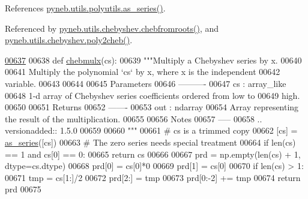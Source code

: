 References \hyperlink{polyutils_8py_source_l00115}{pyneb.\-utils.\-polyutils.\-as\-\_\-series()}.



Referenced by \hyperlink{chebyshev_8py_source_l00472}{pyneb.\-utils.\-chebyshev.\-chebfromroots()}, and \hyperlink{chebyshev_8py_source_l00309}{pyneb.\-utils.\-chebyshev.\-poly2cheb()}.


\begin{DoxyCode}
\hypertarget{namespacepyneb_1_1utils_1_1chebyshev_l00637}{}\hyperlink{namespacepyneb_1_1utils_1_1chebyshev_a91d78fa31041dfe9ccf7bbc0891809b3}{00637} 
00638 \textcolor{keyword}{def }\hyperlink{namespacepyneb_1_1utils_1_1chebyshev_a91d78fa31041dfe9ccf7bbc0891809b3}{chebmulx}(cs):
00639     \textcolor{stringliteral}{"""Multiply a Chebyshev series by x.}
00640 \textcolor{stringliteral}{}
00641 \textcolor{stringliteral}{    Multiply the polynomial `cs` by x, where x is the independent}
00642 \textcolor{stringliteral}{    variable.}
00643 \textcolor{stringliteral}{}
00644 \textcolor{stringliteral}{}
00645 \textcolor{stringliteral}{    Parameters}
00646 \textcolor{stringliteral}{    ----------}
00647 \textcolor{stringliteral}{    cs : array\_like}
00648 \textcolor{stringliteral}{        1-d array of Chebyshev series coefficients ordered from low to}
00649 \textcolor{stringliteral}{        high.}
00650 \textcolor{stringliteral}{}
00651 \textcolor{stringliteral}{    Returns}
00652 \textcolor{stringliteral}{    -------}
00653 \textcolor{stringliteral}{    out : ndarray}
00654 \textcolor{stringliteral}{        Array representing the result of the multiplication.}
00655 \textcolor{stringliteral}{}
00656 \textcolor{stringliteral}{    Notes}
00657 \textcolor{stringliteral}{    -----}
00658 \textcolor{stringliteral}{    .. versionadded:: 1.5.0}
00659 \textcolor{stringliteral}{}
00660 \textcolor{stringliteral}{    """}
00661     \textcolor{comment}{# cs is a trimmed copy}
00662     [cs] = \hyperlink{namespacepyneb_1_1utils_1_1polyutils_a9c3751d438f0f75922155c7823fe2699}{as\_series}([cs])
00663     \textcolor{comment}{# The zero series needs special treatment}
00664     \textcolor{keywordflow}{if} len(cs) == 1 \textcolor{keywordflow}{and} cs[0] == 0:
00665         \textcolor{keywordflow}{return} cs
00666 
00667     prd = np.empty(len(cs) + 1, dtype=cs.dtype)
00668     prd[0] = cs[0]*0
00669     prd[1] = cs[0]
00670     \textcolor{keywordflow}{if} len(cs) > 1:
00671         tmp = cs[1:]/2
00672         prd[2:] = tmp
00673         prd[0:-2] += tmp
00674     \textcolor{keywordflow}{return} prd
00675 

\end{DoxyCode}
